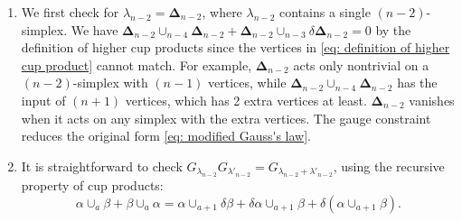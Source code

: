 \documentclass[12pt]{article}
\begin{document}
\begin{enumerate}
    \item We first check for $\lambda_{n-2} = \boldsymbol \Delta_{n-2}$, where $\lambda_{n-2}$ contains a single $(n-2)$-simplex. We have $\boldsymbol \Delta_{n-2} \cup_{n-4} \boldsymbol \Delta_{n-2} + \boldsymbol \Delta_{n-2} \cup_{n-3} \delta \boldsymbol \Delta_{n-2}= 0$ by the definition of higher cup products since the vertices in \eqref{eq: definition of higher cup product} cannot match. For example, $\boldsymbol \Delta_{n-2}$ acts only nontrivial on a $(n-2)$-simplex with $(n-1)$ vertices, while $\boldsymbol \Delta_{n-2} \cup_{n-4} \boldsymbol \Delta_{n-2}$ has the input of $(n+1)$ vertices, which has 2 extra vertices at least. $\boldsymbol \Delta_{n-2}$ vanishes when it acts on any simplex with the extra vertices. The gauge constraint reduces the original form \eqref{eq: modified Gauss's law}.
    
    \item It is straightforward to check $G_{\lambda_{n-2}} G_{\lambda'_{n-2}}= G_{\lambda_{n-2}+\lambda'_{n-2}}$, using the recursive property of cup products:
\begin{equation}
    \alpha \cup_a \beta + \beta \cup_a \alpha = \alpha \cup_{a+1} \delta \beta + \delta \alpha \cup_{a+1} \beta + \delta (\alpha \cup_{a+1} \beta).
\end{equation}
\end{enumerate}
\end{document}
